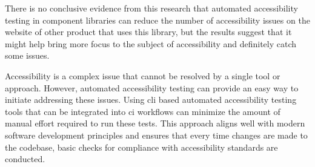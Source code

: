 \documentclass{master_thesis}
\begin{document}
There is no conclusive evidence from this research that automated accessibility testing in component libraries can reduce the number of accessibility issues on the website of other product that uses this library, but the results suggest that it might help bring more focus to the subject of accessibility and definitely catch some issues.

Accessibility is a complex issue that cannot be resolved by a single tool or approach. However, automated accessibility testing can provide an easy way to initiate addressing these issues. Using \ac{cli} based automated accessibility testing tools that can be integrated into \ac{ci} workflows can minimize the amount of manual effort required to run these tests. This approach aligns well with modern software development principles and ensures that every time changes are made to the codebase, basic checks for compliance with accessibility standards are conducted.
\end{document}
